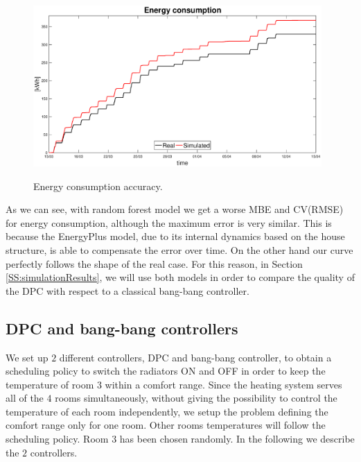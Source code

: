 \begin{figure}[h!]
	\begin{center}
		\includegraphics[width=26pc]{figures/Energy_test.eps}
		\caption{Energy consumption accuracy.}
		\captionsetup{justification=centering}
		\label{F:Energy_testing}
	\end{center}
\end{figure}

As we can see, with random forest model we get a worse MBE and CV(RMSE) for energy consumption, although the maximum error is very similar. This is because the EnergyPlus model, due to its internal dynamics based on the house structure, is able to compensate the error over time. On the other hand our curve perfectly follows the shape of the real case. For this reason, in Section \ref{SS:simulationResults}, we will use both models in order to compare the quality of the DPC with respect to a classical bang-bang controller.

\subsection{DPC and bang-bang controllers} We set up $2$ different controllers, DPC and bang-bang controller, to obtain a scheduling policy to switch the radiators ON and OFF in order to keep the temperature of room $3$ within a comfort range. Since the heating system serves all of the $4$ rooms simultaneously, without giving the possibility to control the temperature of each room independently, we setup the problem defining the comfort range only for one room. Other rooms temperatures will follow the scheduling policy. Room $3$ has been chosen randomly. In the following we describe the $2$ controllers.

